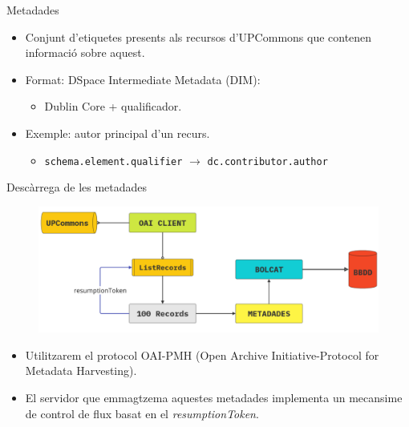 \begin{frame}{Metadades}
    \begin{itemize}%
        \item Conjunt d’etiquetes presents als recursos d’UPCommons que contenen informació sobre aquest.
        \item Format: DSpace Intermediate Metadata (DIM):
        \begin{itemize}%
            \item Dublin Core + qualificador.
        \end{itemize}
        \item Exemple: autor principal d'un recurs.
        \begin{itemize}%
            \item \texttt{schema.element.qualifier} \(\rightarrow\) \texttt{dc.contributor.author}
        \end{itemize}
    \end{itemize}
\end{frame}


\begin{frame}{Descàrrega de les metadades}

    \begin{figure}
        \includegraphics[width=\textwidth]{figures/metadata-processing}\label{fig:metadata-processing}
    \end{figure}

    \begin{itemize}%
        \item Utilitzarem el protocol OAI-PMH (Open Archive Initiative-Protocol for Metadata Harvesting).
        \item El servidor que emmagtzema aquestes metadades implementa un mecansime de control de flux basat en el \textit{resumptionToken}.
    \end{itemize}

\end{frame}